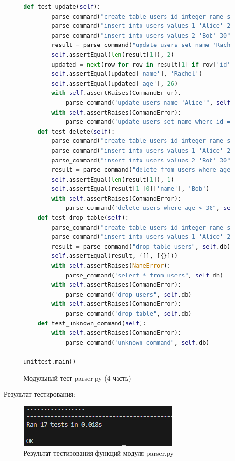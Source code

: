 \begin{figure}[H]
\begin{lstlisting}[language=Python, breaklines=true]		
	def test_update(self):
		parse_command("create table users id integer name string age integer", self.db)
		parse_command("insert into users values 1 'Alice' 25", self.db)
		parse_command("insert into users values 2 'Bob' 30", self.db)        
		result = parse_command("update users set name 'Rachel' age 26 where id == 1", self.db)
		self.assertEqual(len(result[1]), 2)
		updated = next(row for row in result[1] if row['id'] == 1)
		self.assertEqual(updated['name'], 'Rachel')
		self.assertEqual(updated['age'], 26)            
		with self.assertRaises(CommandError):
			parse_command("update users name 'Alice'", self.db)            
		with self.assertRaises(CommandError):
			parse_command("update users set name where id == 1", self.db)
	def test_delete(self):
		parse_command("create table users id integer name string age integer", self.db)
		parse_command("insert into users values 1 'Alice' 25", self.db)
		parse_command("insert into users values 2 'Bob' 30", self.db)        
		result = parse_command("delete from users where age < 30", self.db)
		self.assertEqual(len(result[1]), 1)
		self.assertEqual(result[1][0]['name'], 'Bob')            
		with self.assertRaises(CommandError):
			parse_command("delete users where age < 30", self.db)        
	def test_drop_table(self):
		parse_command("create table users id integer name string age integer", self.db)
		parse_command("insert into users values 1 'Alice' 25", self.db)        
		result = parse_command("drop table users", self.db)
		self.assertEqual(result, ([], [{}]))        
		with self.assertRaises(NameError):
			parse_command("select * from users", self.db)        
		with self.assertRaises(CommandError):
			parse_command("drop users", self.db)            
		with self.assertRaises(CommandError):
			parse_command("drop table", self.db)
	def test_unknown_command(self):
		with self.assertRaises(CommandError):
			parse_command("unknown command", self.db)	

unittest.main()
\end{lstlisting}  
\caption{Модульный тест parser.py (4 часть)}
\label{fig:test_parser_4}
\end{figure}

Результат тестирования:
\begin{figure}[H]
	\centering
	\includegraphics[width=0.7\linewidth]{images/test_parser_results}
	\caption{Результат тестирования функций модуля parser.py}
	\label{fig:test_parser_results}
\end{figure}

